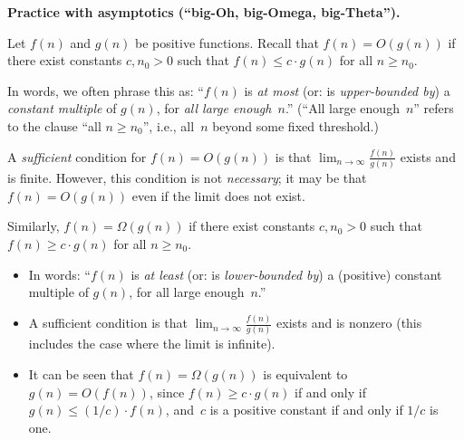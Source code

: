 \documentclass[11pt,addpoints]{exam}
\begin{document}
\begin{questions}
  
  \question \textbf{Practice with asymptotics (``big-Oh, big-Omega, big-Theta'').}

  Let $f(n)$ and $g(n)$ be positive functions.
  Recall that $f(n) = O(g(n))$ if there exist constants $c, n_0 > 0$ such that $f(n) \leq c \cdot g(n)$ for all $n \geq n_0$.

  In words, we often phrase this as: ``$f(n)$ is \emph{at most} (or: is \emph{upper-bounded by}) a \emph{constant multiple} of $g(n)$, for \emph{all large enough}~$n$.''
  (``All large enough~$n$'' refers to the clause ``all $n \geq n_{0}$'', i.e., all~$n$ beyond some fixed threshold.)

  A \emph{sufficient} condition for $f(n) = O(g(n))$ is that $\lim_{n \to \infty} \frac{f(n)}{g(n)}$ exists and is finite.
  However, this condition is not \emph{necessary}; it may be that $f(n)=O(g(n))$ even if the limit does not exist.

  Similarly, $f(n) = \Omega(g(n))$ if there exist constants $c, n_{0} > 0$ such that $f(n) \geq c \cdot g(n)$ for all $n \geq n_{0}$.
  \begin{itemize}
  \item In words: ``$f(n)$ is \emph{at least} (or: is \emph{lower-bounded by}) a (positive) constant multiple of $g(n)$, for all large enough~$n$.''
  \item A sufficient condition is that $\lim_{n \to \infty} \frac{f(n)}{g(n)}$ exists and is nonzero (this includes the case where the limit is infinite).
  \item It can be seen that $f(n) = \Omega(g(n))$ is equivalent to $g(n) = O(f(n))$, since $f(n) \geq c \cdot g(n)$ if and only if $g(n) \leq (1/c) \cdot f(n)$, and~$c$ is a positive constant if and only if $1/c$ is one.
  \end{itemize}
  

\end{questions}
\end{document}
